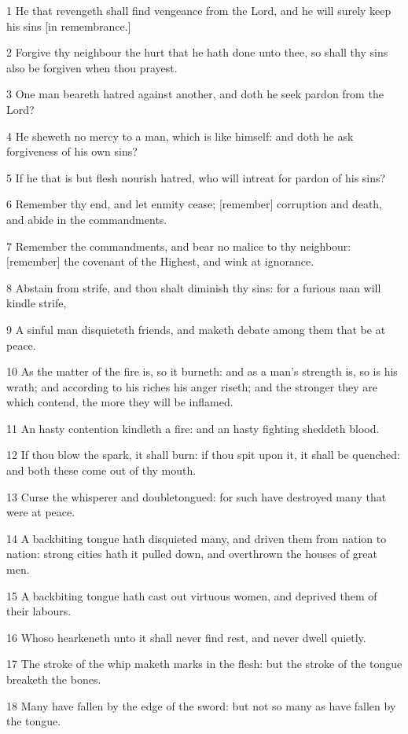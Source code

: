 \par 1 He that revengeth shall find vengeance from the Lord, and he will surely keep his sins [in remembrance.]
\par 2 Forgive thy neighbour the hurt that he hath done unto thee, so shall thy sins also be forgiven when thou prayest.
\par 3 One man beareth hatred against another, and doth he seek pardon from the Lord?
\par 4 He sheweth no mercy to a man, which is like himself: and doth he ask forgiveness of his own sins?
\par 5 If he that is but flesh nourish hatred, who will intreat for pardon of his sins?
\par 6 Remember thy end, and let enmity cease; [remember] corruption and death, and abide in the commandments.
\par 7 Remember the commandments, and bear no malice to thy neighbour: [remember] the covenant of the Highest, and wink at ignorance.
\par 8 Abstain from strife, and thou shalt diminish thy sins: for a furious man will kindle strife,
\par 9 A sinful man disquieteth friends, and maketh debate among them that be at peace.
\par 10 As the matter of the fire is, so it burneth: and as a man's strength is, so is his wrath; and according to his riches his anger riseth; and the stronger they are which contend, the more they will be inflamed.
\par 11 An hasty contention kindleth a fire: and an hasty fighting sheddeth blood.
\par 12 If thou blow the spark, it shall burn: if thou spit upon it, it shall be quenched: and both these come out of thy mouth.
\par 13 Curse the whisperer and doubletongued: for such have destroyed many that were at peace.
\par 14 A backbiting tongue hath disquieted many, and driven them from nation to nation: strong cities hath it pulled down, and overthrown the houses of great men.
\par 15 A backbiting tongue hath cast out virtuous women, and deprived them of their labours.
\par 16 Whoso hearkeneth unto it shall never find rest, and never dwell quietly.
\par 17 The stroke of the whip maketh marks in the flesh: but the stroke of the tongue breaketh the bones.
\par 18 Many have fallen by the edge of the sword: but not so many as have fallen by the tongue.

